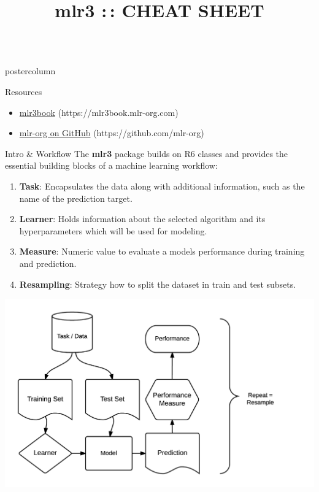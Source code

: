\documentclass{beamer}
\title{mlr3 :\,: CHEAT SHEET} %
\newlength{\columnheight} %
\begin{document}
\begin{frame}[fragile]{}
	\begin{columns}
		\begin{column}{.245\textwidth}
			\begin{beamercolorbox}[center]{postercolumn}
				\begin{minipage}{.98\textwidth}
					\parbox[t][\columnheight]{\textwidth}{
						\begin{myblock}{Resources}
							\begin{itemize}
								\item \href{https://mlr3book.mlr-org.com/index.html}{mlr3book} (https://mlr3book.mlr-org.com)
								\item \href{https://github.com/mlr-org}{mlr-org on GitHub} (https://github.com/mlr-org)
							\end{itemize}
						\end{myblock}
						\begin{myblock}{Intro \& Workflow}
							The \textbf{mlr3} package builds on R6 classes and provides the essential building
							blocks of a machine learning workflow:
							\vspace{1.5em}
							\begin{enumerate}
								\item \textbf{Task}: Encapsulates the data along with additional information, such as the name of the prediction target.
								\item \textbf{Learner}: Holds information about the selected algorithm and its hyperparameters which will be used for modeling.
								\item \textbf{Measure}: Numeric value to evaluate a models performance during training and prediction.
								\item \textbf{Resampling}: Strategy how to split the dataset in train and test subsets.
							\end{enumerate}
							\vspace{1.5em}
							\includegraphics[width=1.13\textwidth]{img/ml_abstraction.png}

\end{myblock}}
\end{minipage}
\end{beamercolorbox}
\end{column}
\end{columns}
\end{frame}
\end{document}
